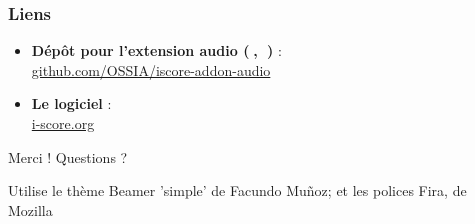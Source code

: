 \documentclass{beamer}
\begin{document}
\begin{frame}
    \frametitle{Liens} 
    \Large
    \begin{itemize}
        \setlength\itemsep{1em}
        \item \textbf{Dépôt pour l'extension audio ({\unicodefun 🍎, 🐧})} :~\\
        \url{github.com/OSSIA/iscore-addon-audio}
        \item \textbf{Le logiciel} :~\\
         \url{i-score.org}
    \end{itemize}
        
    \centering
    \vspace{2em}
    \Large{Merci ! Questions ?}
    \vspace{2em}
    
    \tiny{Utilise le thème Beamer 'simple' de Facundo Muñoz; et les polices Fira, de Mozilla}
\end{frame}    

\begin{frame}
	
	
\end{frame}
\end{document}
